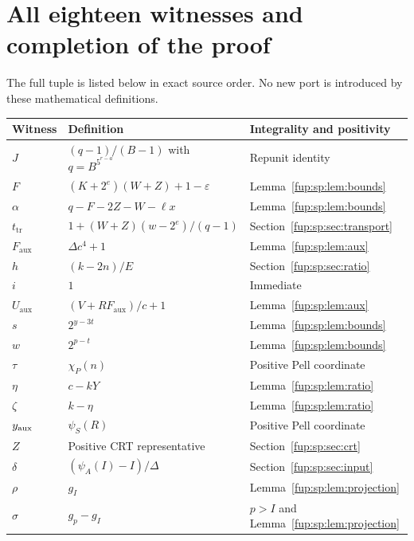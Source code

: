 \documentclass[11pt,letterpaper]{article}
\theoremstyle{definition}\newtheorem{definition}[theorem]{Definition}
\theoremstyle{remark}\newtheorem{remark}[theorem]{Remark}
\newcommand{\D}{\Delta}
\newcommand{\ch}[2]{\chi_{#1}(#2)}\newcommand{\ps}[2]{\psi_{#1}(#2)}
\newcommand{\Fa}{F_{\mathrm{aux}}}\newcommand{\Ua}{U_{\mathrm{aux}}}\newcommand{\ttt}{t_{\mathrm{tr}}}
\begin{document}
\section{All eighteen witnesses and completion of the proof}
\label{fup:sp:sec:assembly}
The full tuple is listed below in exact source order. No new port is
introduced by these mathematical definitions.
\begin{longtable}{@{}p{}p{}p{}@{}}
\toprule
Witness&Definition&Integrality and positivity\\\midrule\endhead
$J$&$(q-1)/(B-1)$ with $q=B^{5^{r-a}}$&Repunit identity\\
$F$&$(K+2^e)(W+Z)+1-\varepsilon$&Lemma~\ref{fup:sp:lem:bounds}\\
$\alpha$&$q-F-2Z-W-\ell x$&Lemma~\ref{fup:sp:lem:bounds}\\
$\ttt$&$1+(W+Z)(w-2^e)/(q-1)$&Section~\ref{fup:sp:sec:transport}\\
$\Fa$&$\D c^4+1$&Lemma~\ref{fup:sp:lem:aux}\\
$h$&$(k-2n)/E$&Section~\ref{fup:sp:sec:ratio}\\
$i$&$1$&Immediate\\
$\Ua$&$(V+R\Fa)/c+1$&Lemma~\ref{fup:sp:lem:aux}\\
$s$&$2^{y-3t}$&Lemma~\ref{fup:sp:lem:bounds}\\
$w$&$2^{p-t}$&Lemma~\ref{fup:sp:lem:bounds}\\
$\tau$&$\ch P n$&Positive Pell coordinate\\
$\eta$&$c-kY$&Lemma~\ref{fup:sp:lem:ratio}\\
$\zeta$&$k-\eta$&Lemma~\ref{fup:sp:lem:ratio}\\
$y_{\mathrm{aux}}$&$\ps S R$&Positive Pell coordinate\\
$Z$&Positive CRT representative&Section~\ref{fup:sp:sec:crt}\\
$\delta$&$(\ps A I-I)/\D$&Section~\ref{fup:sp:sec:input}\\
$\rho$&$g_I$&Lemma~\ref{fup:sp:lem:projection}\\
$\sigma$&$g_p-g_I$&$p>I$ and Lemma~\ref{fup:sp:lem:projection}\\\bottomrule
\end{longtable}
\end{document}
